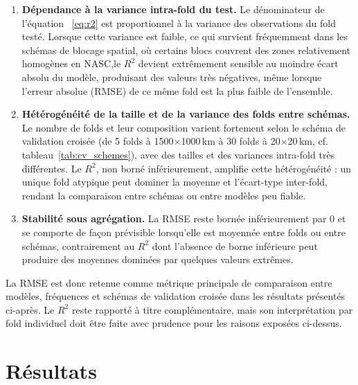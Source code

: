 \documentclass[11pt,a4paper,oneside]{report}
\begin{document}
	\begin{enumerate}
		\item \textbf{Dépendance à la variance intra-fold du test.} Le dénominateur de l'équation ~\eqref{eq:r2} est proportionnel à la variance des observations du fold testé. Lorsque cette variance est faible, ce qui survient fréquemment dans les schémas de blocage spatial, où certains blocs couvrent des zones relativement homogènes en NASC,le $R^2$ devient extrêmement sensible au moindre écart absolu du modèle, produisant des valeurs très négatives, même lorsque l'erreur absolue (RMSE) de ce même fold est la plus faible de l'ensemble. 
		\item \textbf{Hétérogénéité de la taille et de la variance des folds entre schémas.} Le nombre de folds et leur composition varient fortement selon le schéma de validation croisée (de 5 folds à 1500$\times$1000\,km à 30 folds à 20$\times$20\,km, cf. tableau~\ref{tab:cv_schemes}), avec des tailles et des variances intra-fold très différentes. Le $R^2$, non borné inférieurement, amplifie cette hétérogénéité : un unique fold atypique peut dominer la moyenne et l'écart-type inter-fold, rendant la comparaison entre schémas ou entre modèles peu fiable.
		\item \textbf{Stabilité sous agrégation.} La RMSE reste bornée inférieurement par 0 et se comporte de façon prévisible lorsqu'elle est moyennée entre folds ou entre schémas, contrairement au $R^2$ dont l'absence de borne inférieure peut produire des moyennes dominées par quelques valeurs extrêmes.
	\end{enumerate}
	
	La RMSE est donc retenue comme métrique principale de comparaison entre modèles, fréquences et schémas de validation croisée dans les résultats présentés ci-après. Le $R^2$ reste rapporté à titre complémentaire, mais son interprétation par fold individuel doit être faite avec prudence pour les raisons exposées ci-dessus.
	
	
	
	\clearpage
	\chapter{Résultats}
	
\end{document}
